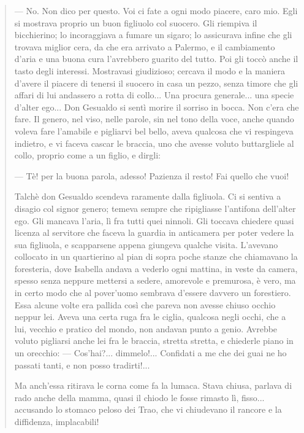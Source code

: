 \documentclass{book}
\newcounter{mar}
\begin{document}
\begin{quote}
— No. Non dico per questo. Voi ci fate a ogni modo piacere, caro mio.
Egli si mostrava proprio un buon figliuolo col suocero. Gli riempiva il bicchierino; lo incoraggiava a fumare un sigaro; lo assicurava infine che gli trovava miglior cera, da che era arrivato a Palermo, e il cambiamento d’aria e una buona cura l’avrebbero guarito del tutto. Poi gli toccò anche il tasto degli interessi. Mostravasi giudizioso; cercava il modo e la maniera d’avere il piacere di tenersi il suocero in casa un pezzo, senza timore che gli affari di lui andassero a rotta di collo... Una procura generale... una specie d’alter ego... Don Gesualdo si sentì morire il sorriso in bocca. Non c’era che fare. Il genero, nel viso, nelle parole, sin nel tono della voce, anche quando voleva fare l’amabile e pigliarvi bel bello, aveva qualcosa che vi respingeva indietro, e vi faceva cascar le braccia, uno che avesse voluto buttargliele al collo, proprio come a un figlio, e dirgli:

— Tè! per la buona parola, adesso! Pazienza il resto! Fai quello che vuoi!

Talchè don Gesualdo scendeva raramente dalla figliuola. Ci si sentiva a disagio col signor genero; temeva sempre che ripigliasse l’antifona dell’alter ego. Gli mancava l’aria, lì fra tutti quei ninnoli. Gli toccava chiedere quasi licenza al servitore che faceva la guardia in anticamera per poter vedere la sua figliuola, e scapparsene appena giungeva qualche visita. L’avevano collocato in un quartierino al pian di sopra poche stanze che chiamavano la foresteria, dove Isabella andava a vederlo ogni mattina, in veste da camera, spesso senza neppure mettersi a sedere, amorevole e premurosa, è vero, ma in certo modo che al pover’uomo sembrava d’essere davvero un forestiero. Essa alcune volte era pallida così che pareva non avesse chiuso occhio neppur lei. Aveva una certa ruga fra le ciglia, qualcosa negli occhi, che a lui, vecchio e pratico del mondo, non andavan punto a genio. Avrebbe voluto pigliarsi anche lei fra le braccia, stretta stretta, e chiederle piano in un orecchio: — Cos’hai?... dimmelo!... Confidati a me che dei guai ne ho passati tanti, e non posso tradirti!...

Ma anch’essa ritirava le corna come fa la lumaca. Stava chiusa, parlava di rado anche della mamma, quasi il chiodo le fosse rimasto lì, fisso... accusando lo stomaco peloso dei Trao, che vi chiudevano il rancore e la diffidenza, implacabili!


\end{quote}
\end{document}
